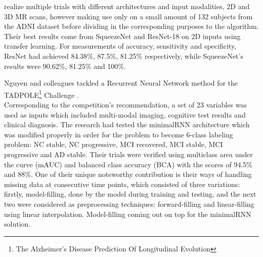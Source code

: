 \documentclass[a4paper, 12pt]{article}
\begin{document}
\cite{10.1117/1.JMI.8.2.024503} realize multiple trials with different architectures and input modalities, 2D and 3D MR scans,
however making use only on a small amount of 132 subjects from the ADNI dataset before dividing in the corresponding purposes
to the algorithm. Their best results come from SqueezeNet and ResNet-18 on 2D inputs using transfer learning.
For measurements of accuracy, sensitivity and specificity, ResNet had achieved 84.38\%, 87.5\%, 81.25\% respectively, while
SqueezeNet's results were 90.62\%, 81.25\% and 100\%.


Nguyen and colleagues tackled a Recurrent Neural Network method for the TADPOLE\footnote{The Alzheimer's Disease Prediction
    Of Longitudinal Evolution} Challenge \cite{NGUYEN2020117203}. \\
Corresponding to the competition's recommendation, a set of 23 variables was used as inputs which included multi-modal
imaging, cognitive test results and clinical diagnosis. The research had tested the minimalRNN architecture \cite{Chen2017MinimalRNNTM}
which was modified properly in order for the problem to become 6-class labeling problem: NC stable, NC progressive, MCI recovered,
MCI stable, MCI progressive and AD stable. Their trials were verified using multiclass area under the curve (mAUC) and balanced
class accuracy (BCA) with the scores of 94.5\% and 88\%. One of their unique noteworthy contribution is their ways of
handling missing data at consecutive time points, which consisted of three variations: firstly, model-filling, done by the model
during training and testing, and the next two were considered as preprocessing techniques: forward-filling and linear-filling using linear
interpolation. Model-filling coming out on top for the minimalRNN solution.
\end{document}
